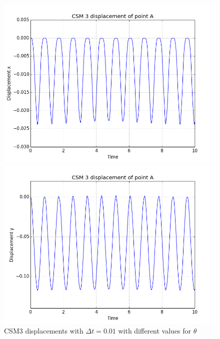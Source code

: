 \begin{figure}[H]
\begin{minipage}[b]{0.6\linewidth}
    \caption{$\theta = 1 $} 
    \vspace{4ex}
  \end{minipage} 
  \begin{minipage}[b]{0.6\linewidth}
    \centering
    \includegraphics[scale=0.40]{./Temporal_stability/CSM3_Crank.png} 
    \caption{$\theta = 0.5 $} 
    \vspace{4ex}
  \end{minipage}%
  \begin{minipage}[b]{0.6\linewidth}
    \centering
    \includegraphics[scale=0.40]{./Temporal_stability/CSM3_Crank_y.png} 
    \caption{$\theta = 0.5 $} 
    \vspace{4ex}
  \end{minipage} 
 \label{fig:CSM3_dis_plots} 
 \caption {CSM3 displacements with $\Delta t = 0.01$ with different values for $\theta$}
\end{figure}


